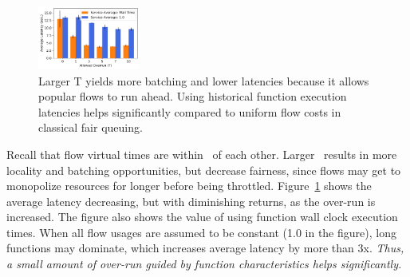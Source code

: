 
\begin{figure}
  \centering
  \includegraphics[width=0.3\textwidth]{../graphs/unfairness/25.7/e2e_sec.pdf} 
  \vspace*{-5pt}
  \caption{Larger T yields more batching and lower latencies because it allows popular flows to run ahead. Using historical function execution latencies helps significantly compared to uniform flow costs in classical fair queuing.}
  \label{fig:T-service}
    \vspace*{-7pt}
\end{figure}

Recall that flow virtual times are within \T~of each other.
Larger \T~results in more locality and batching opportunities, but decrease fairness, since flows may get to monopolize resources for longer before being throttled.
Figure~\ref{fig:T-service} shows the average latency decreasing, but with diminishing returns, as the over-run is increased. 
The figure also shows the value of using function wall clock execution times.
When all flow usages are assumed to be constant (1.0 in the figure), long functions may dominate, which increases average latency by more than 3x.
\emph{Thus, a small amount of over-run guided by function characteristics helps significantly.}

